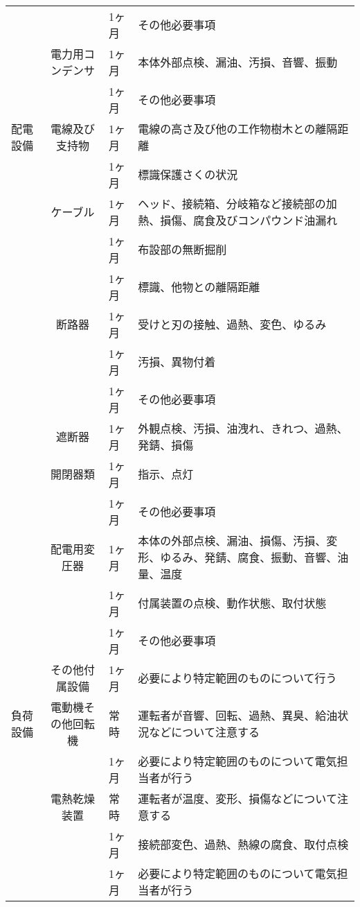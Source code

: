\documentclass[10pt,a4paper,uplatex]{jsarticle}
\begin{document}
\begin{table}[!b]
\begin{tabular}{|l|c|p{1cm}|p{10cm}|}
    &              & 1ヶ月 & その他必要事項  \\ \cline{2-4}
    &電力用コンデンサ& 1ヶ月 & 本体外部点検、漏油、汚損、音響、振動  \\
    &              & 1ヶ月 & その他必要事項  \\ \cline{2-4}
    \hline  
配電設備
    &電線及び支持物  & 1ヶ月 & 電線の高さ及び他の工作物樹木との離隔距離  \\
    &              & 1ヶ月 & 標識保護さくの状況  \\ \cline{2-4}
    &ケーブル       & 1ヶ月 & ヘッド、接続箱、分岐箱など接続部の加熱、損傷、腐食及びコンパウンド油漏れ  \\
    &              & 1ヶ月 & 布設部の無断掘削  \\ 
    &              & 1ヶ月 & 標識、他物との離隔距離  \\ \cline{2-4}
    &断路器         & 1ヶ月 & 受けと刃の接触、過熱、変色、ゆるみ  \\
    &              & 1ヶ月 & 汚損、異物付着  \\
    &              & 1ヶ月 & その他必要事項  \\\cline{2-4}
    &遮断器         & 1ヶ月 & 外観点検、汚損、油洩れ、きれつ、過熱、発錆、損傷  \\
    &開閉器類       & 1ヶ月 & 指示、点灯  \\ 
    &              & 1ヶ月 & その他必要事項  \\ \cline{2-4}
    &配電用変圧器   & 1ヶ月 & 本体の外部点検、漏油、損傷、汚損、変形、ゆるみ、発錆、腐食、振動、音響、油量、温度  \\
    &              & 1ヶ月 & 付属装置の点検、動作状態、取付状態  \\ 
    &              & 1ヶ月 & その他必要事項  \\ \cline{2-4}
    &その他付属設備 & 1ヶ月 & 必要により特定範囲のものについて行う  \\ \cline{2-4}
    \hline 
負荷設備
    &電動機その他回転機& 常時 & 運転者が音響、回転、過熱、異臭、給油状況などについて注意する  \\
    &              & 1ヶ月 & 必要により特定範囲のものについて電気担当者が行う  \\ \cline{2-4}
    &電熱乾燥装置     & 常時 & 運転者が温度、変形、損傷などについて注意する  \\
    &              & 1ヶ月 & 接続部変色、過熱、熱線の腐食、取付点検  \\ 
    &              & 1ヶ月 & 必要により特定範囲のものについて電気担当者が行う  \\ \cline{2-4}

\end{tabular}
\end{table}
\end{document}
